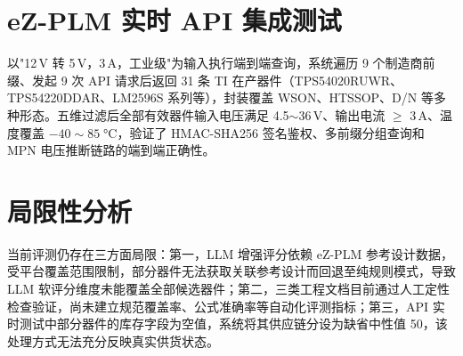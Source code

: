\section{eZ-PLM 实时 API 集成测试}

以"12\,V 转 5\,V，3\,A，工业级"为输入执行端到端查询，系统遍历 9 个制造商前缀、发起 9 次 API 请求后返回 31 条 TI 在产器件（TPS54020RUWR、TPS54220DDAR、LM2596S 系列等），封装覆盖 WSON、HTSSOP、D/N 等多种形态。五维过滤后全部有效器件输入电压满足 4.5$\sim$36\,V、输出电流 $\ge$ 3\,A、温度覆盖 $-40\sim85\;$°C，验证了 HMAC-SHA256 签名鉴权、多前缀分组查询和 MPN 电压推断链路的端到端正确性。

\section{局限性分析}

当前评测仍存在三方面局限：第一，LLM 增强评分依赖 eZ-PLM 参考设计数据，受平台覆盖范围限制，部分器件无法获取关联参考设计而回退至纯规则模式，导致 LLM 软评分维度未能覆盖全部候选器件；第二，三类工程文档目前通过人工定性检查验证，尚未建立规范覆盖率、公式准确率等自动化评测指标；第三，API 实时测试中部分器件的库存字段为空值，系统将其供应链分设为缺省中性值 50，该处理方式无法充分反映真实供货状态。
